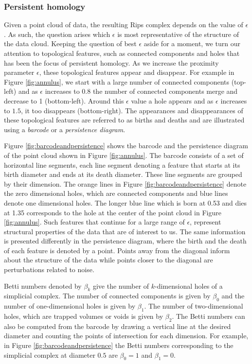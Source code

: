 \documentclass[11pt,a4paper,]{article}
\theoremstyle{definition}
\theoremstyle{definition}
\theoremstyle{definition}
\theoremstyle{remark}
\begin{document}
\hypertarget{subsec:persistenthomology}{%
\subsubsection{Persistent homology}\label{subsec:persistenthomology}}

Given a point cloud of data, the resulting Rips complex depends on the value of \(\epsilon\). As such, the question arises which \(\epsilon\) is most representative of the structure of the data cloud. Keeping the question of best \(\epsilon\) aside for a moment, we turn our attention to topological features, such as connected components and holes that has been the focus of persistent homology. As we increase the proximity parameter \(\epsilon\), these topological features appear and disappear. For example in Figure \ref{fig:annulus}, we start with a large number of connected components (top-left) and as \(\epsilon\) increases to \(0.8\) the number of connected components merge and decrease to 1 (bottom-left). Around this \(\epsilon\) value a hole appears and as \(\epsilon\) increases to \(1.5\), it too disappears (bottom-right). The appearances and disappearances of these topological features are referred to as births and deaths and are illustrated using a \emph{barcode} or a \emph{persistence diagram}.

Figure \ref{fig:barcodeandpersistence} shows the barcode and the persistence diagram of the point cloud shown in Figure \ref{fig:annulus}. The barcode consists of a set of horizontal line segments, each line segment denoting a feature that starts at its birth diameter and ends at its death diameter. These line segments are grouped by their dimension. The orange lines in Figure \ref{fig:barcodeandpersistence} denote the zero dimensional holes, which are connected components and blue lines denote one dimensional holes. The longer blue line which is born at 0.53 and dies at 1.35 corresponds to the hole at the center of the point cloud in Figure \ref{fig:annulus}. Such features that continue for a large range of \(\epsilon\), represent structural properties of the data that are of interest to us. The same information is presented differently in the persistence diagram, where the birth and the death of each feature is denoted by a point. Points away from the diagonal inform about the structure of the data while points closer to the diagonal are perturbations related to noise.

Betti numbers denoted by \(\beta_k\) give the number of \(k\)-dimensional holes of a simplicial complex. The number of connected components is given by \(\beta_0\) and the number of one-dimensional holes is given by \(\beta_1\). The number of two-dimensional holes, which are trapped volumes or voids is given by \(\beta_2\). The Betti numbers can also be computed from the barcode by drawing a vertical line at the desired diameter and counting the points of intersection for each dimension. For example, in Figure \ref{fig:barcodeandpersistence} the Betti numbers corresponding to the simplicial complex at diameter \(0.5\) are \(\beta_0 = 1\) and \(\beta_1 = 0\).
\end{document}
